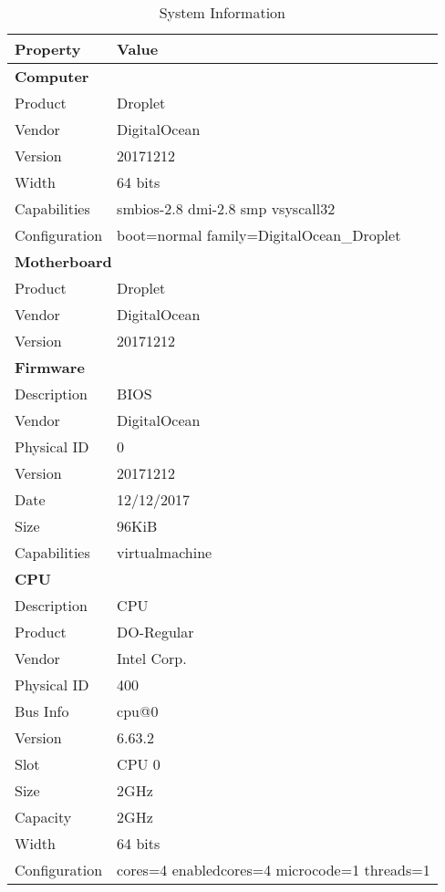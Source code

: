 \documentclass{article}
\begin{document}
  \newpage
  \pagestyle{fancy} %
  \begin{table}[htbp]
    \centering
    \caption{System Information}
    \begin{tabular}{ll}
      \toprule
      \textbf{Property} & \textbf{Value} \\
      \midrule
      \multicolumn{2}{l}{\textbf{Computer}} \\
      Product & Droplet \\
      Vendor & DigitalOcean \\
      Version & 20171212 \\
      Width & 64 bits \\
      Capabilities & smbios-2.8 dmi-2.8 smp vsyscall32 \\
      Configuration & boot=normal family=DigitalOcean\_Droplet \\
      \midrule
      \multicolumn{2}{l}{\textbf{Motherboard}} \\
      Product & Droplet \\
      Vendor & DigitalOcean \\
      Version & 20171212 \\
      \midrule
      \multicolumn{2}{l}{\textbf{Firmware}} \\
      Description & BIOS \\
      Vendor & DigitalOcean \\
      Physical ID & 0 \\
      Version & 20171212 \\
      Date & 12/12/2017 \\
      Size & 96KiB \\
      Capabilities & virtualmachine \\
      \midrule
      \multicolumn{2}{l}{\textbf{CPU}} \\
      Description & CPU \\
      Product & DO-Regular \\
      Vendor & Intel Corp. \\
      Physical ID & 400 \\
      Bus Info & cpu@0 \\
      Version & 6.63.2 \\
      Slot & CPU 0 \\
      Size & 2GHz \\
      Capacity & 2GHz \\
      Width & 64 bits \\
      Configuration & cores=4 enabledcores=4 microcode=1 threads=1 \\

\end{tabular}
\end{table}
\end{document}
